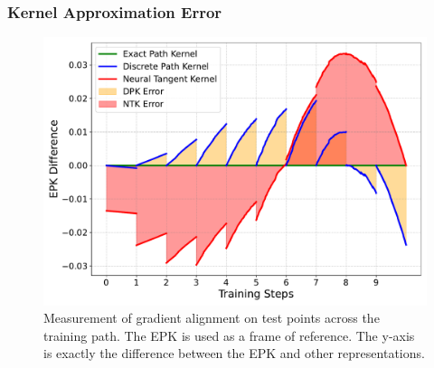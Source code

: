\begin{frame}
\frametitle{Kernel Approximation Error}

\begin{figure}[!ht]
        \centering
        \includegraphics[width=0.8\linewidth]{c4_figures/estimation_comparison.pdf}

        \caption{Measurement of gradient alignment on test points across the training path. The EPK is used as a frame of reference. The y-axis is exactly the difference between the EPK and other representations.} %
        \label{fig:error}
\end{figure}
\end{frame}


